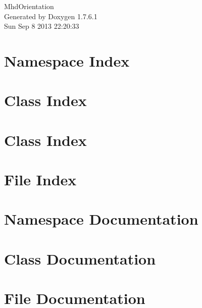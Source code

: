 \documentclass[a4paper]{book}
\begin{document}
\hypersetup{pageanchor=false,citecolor=blue}
\begin{titlepage}
\vspace*{7cm}
\begin{center}
{\Large \-Mhd\-Orientation }\\
\vspace*{1cm}
{\large \-Generated by Doxygen 1.7.6.1}\\
\vspace*{0.5cm}
{\small Sun Sep 8 2013 22:20:33}\\
\end{center}
\end{titlepage}
\clearemptydoublepage
{}
\tableofcontents
\clearemptydoublepage
{}
\hypersetup{pageanchor=true,citecolor=blue}
\chapter{\-Namespace \-Index}

\chapter{\-Class \-Index}

\chapter{\-Class \-Index}

\chapter{\-File \-Index}

\chapter{\-Namespace \-Documentation}


\chapter{\-Class \-Documentation}









\chapter{\-File \-Documentation}













\printindex
\end{document}

